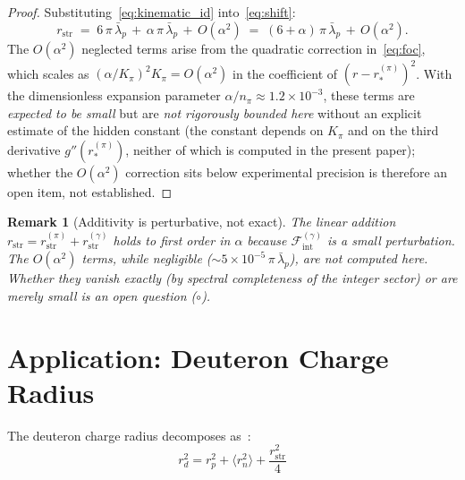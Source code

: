 \documentclass[12pt]{article}
\newtheorem{remark}[theorem]{Remark}
\newcommand{\Fcal}{\mathcal{F}}
\newcommand{\Fint}{\Fcal_{\mathrm{int}}}
\newcommand{\lbar}{\bar{\lambda}}
\begin{document}
\begin{proof}
Substituting~\eqref{eq:kinematic_id} into~\eqref{eq:shift}:
\begin{equation}\label{eq:6plusalpha}
    r_{\mathrm{str}} \;=\; 6\,\pi\,\lbar_p \,+\, \alpha\,\pi\,\lbar_p \,+\, O(\alpha^2)
    \;=\; (6 + \alpha)\,\pi\,\lbar_p \,+\, O(\alpha^2).
\end{equation}
The $O(\alpha^2)$ neglected terms arise from the quadratic correction
in~\eqref{eq:foc}, which scales as $(\alpha/K_\pi)^2 K_\pi = O(\alpha^2)$ in the coefficient of $(r - r_*^{(\pi)})^2$. With the dimensionless expansion parameter $\alpha/n_\pi \approx 1.2 \times 10^{-3}$, these terms are \emph{expected to be small} but are \emph{not rigorously bounded here} without an explicit estimate of the hidden constant (the constant depends on $K_\pi$ and on the third derivative $g''(r_*^{(\pi)})$, neither of which is computed in the present paper); whether the $O(\alpha^2)$ correction sits below experimental precision is therefore an open item, not established.
\end{proof}

\begin{remark}[Additivity is perturbative, not exact]
The linear addition $r_{\mathrm{str}} = r_{\mathrm{str}}^{(\pi)} +
r_{\mathrm{str}}^{(\gamma)}$ holds to first order in $\alpha$ because
$\Fint^{(\gamma)}$ is a small perturbation. The $O(\alpha^2)$ terms,
while negligible ($\sim 5 \times 10^{-5}\,\pi\,\lbar_p$), are not
computed here. Whether they vanish exactly (by spectral completeness of
the integer sector) or are merely small is an open question ($\circ$).
\end{remark}

\section{Application: Deuteron Charge Radius}\label{sec:deuteron}

The deuteron charge radius decomposes as~\citep{SmartRadius}:
\begin{equation}\label{eq:deuteron}
    r_d^2 = r_p^2 + \langle r_n^2\rangle + \frac{r_{\mathrm{str}}^2}{4}
\end{equation}
\end{document}
